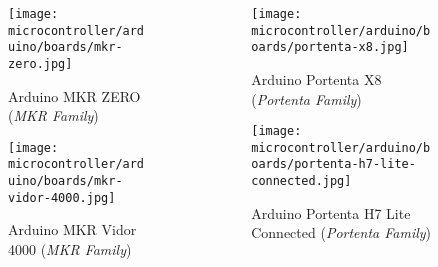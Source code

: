 \begin{frame}
    \begin{columns}
        \begin{column}{0.5\textwidth}
            \begin{figure}
                \texttt{[image: microcontroller/arduino/boards/mkr-zero.jpg]}
                \caption{Arduino\textregistered{} MKR ZERO (\textit{MKR Family})}
            \end{figure}
            \begin{figure}
                \texttt{[image: microcontroller/arduino/boards/mkr-vidor-4000.jpg]}
                \caption{Arduino\textregistered{} MKR Vidor 4000 (\textit{MKR Family})}
            \end{figure}
        \end{column}
        \begin{column}{0.5\textwidth}
            \begin{figure}
                \texttt{[image: microcontroller/arduino/boards/portenta-x8.jpg]}
                \caption{Arduino\textregistered{} Portenta X8 (\textit{Portenta Family})}
            \end{figure}
            \begin{figure}
                \texttt{[image: microcontroller/arduino/boards/portenta-h7-lite-connected.jpg]}
                \caption{Arduino\textregistered{} Portenta H7 Lite Connected (\textit{Portenta Family})}
            \end{figure}
        \end{column}
    \end{columns}
\end{frame}
